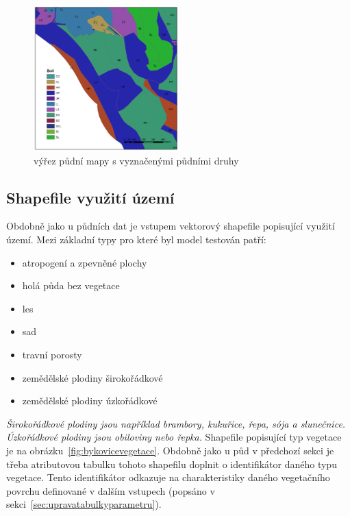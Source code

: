 \begin{figure}
  \centering
  \includegraphics[width=0.5\textwidth]{./img/pudy.png}
  \caption{výřez půdní mapy s vyznačenými půdními druhy}
  \label{fig:bykovicepuda}
\end{figure}

 
\subsection{Shapefile využití území} \label{sec:vstupvegetace}

Obdobně jako u půdních dat je vstupem vektorový shapefile popisující využití území. Mezi základní typy pro které byl model testován patří:
\begin{itemize} \itemsep 0pt
  \item atropogení a zpevněné plochy  
  \item holá půda bez vegetace
  \item les
  \item sad
  \item travní porosty
  \item zemědělské plodiny širokořádkové
  \item zemědělské plodiny úzkořádkové
\end{itemize}

\textit{Širokořádkové plodiny jsou například brambory, kukuřice, řepa, sója a slunečnice. Úzkořádkové plodiny jsou obiloviny nebo řepka.}
Shapefile popisující typ vegetace je na obrázku~\ref{fig:bykovicevegetace}. Obdobně jako u půd v předchozí sekci je třeba atributovou tabulku tohoto shapefilu doplnit o identifikátor daného typu vegetace. Tento identifikátor odkazuje na charakteristiky daného vegetačního povrchu definované v dalším vstupech (popsáno v sekci~\ref{sec:upravatabulkyparametru}).

